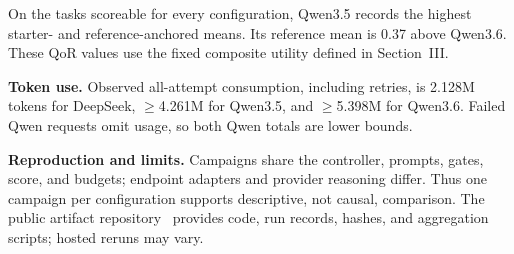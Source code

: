 On the \CommonQorTaskCount{} tasks scoreable for every configuration, Qwen3.5
records the highest starter- and reference-anchored means. Its reference mean
is 0.37 above Qwen3.6. These QoR values use the fixed composite utility defined
in Section~III.

\textbf{Token use.} Observed all-attempt consumption, including retries, is
2.128M tokens for DeepSeek, $\geq$4.261M for Qwen3.5, and $\geq$5.398M for
Qwen3.6. Failed Qwen requests omit usage, so both Qwen totals are lower bounds.

\textbf{Reproduction and limits.} Campaigns share the controller, prompts,
gates, score, and budgets; endpoint adapters and provider reasoning differ.
Thus one campaign per configuration supports descriptive, not causal,
comparison. The public artifact repository~\cite{fpt26repo} provides code,
run records, hashes, and aggregation scripts; hosted reruns may vary.

